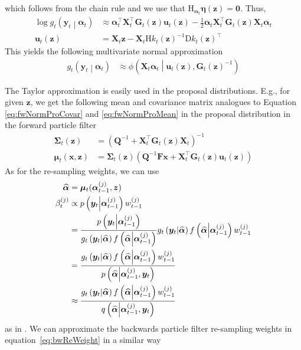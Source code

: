 \documentclass[notitlepage]{article}
\renewcommand{\vec}[1]{\bm{#1}}
\newcommand{\mat}[1]{\mathbf{#1}}
\newcommand{\Lparen}[1]{\left( #1\right)}
\newcommand{\Cond}[2]{ #1 \middle\vert  #2}
\newcommand{\optor}[2]{#1\Lparen{#2}}
\newcommand{\optorC}[3]{\optor{#1}{\Cond{#2}{#3}}}
\newcommand{\pdensC}[2]{\optorC{p}{#1}{#2}}
\newcommand{\normaldC}[3]{\optorC{\phi}{#1}{#2,#3}}
\newcommand{\IDC}[2]{\optorC{q}{#1}{#2}}
\newcommand{\partic}[3]{#1_{#2}^{\Lparen{#3}}}
\newcommand\Jaco{\mathrm D}
\newcommand\Hess{\mathrm H}
\begin{document}
%
which follows from the chain rule and we use that %
$\Hess_{\vec\alpha_t}\vec\eta(\vec z) = \mat 0$. Thus, %
%
\begin{align*}
\log\optorC{g_t}{\vec{y}_t}{\vec\alpha_t} &\approx 
	\vec\alpha_t^\top\mat X_t^\top\mat G_t(\vec z)\vec u_t(\vec z)
	- \frac 12 \vec\alpha_t\mat X_t^\top
	\mat G_t(\vec z)\mat X_t\vec\alpha_t \\
\vec u_t(\vec z) &= 
	\mat X_t\vec z - \mat X_t\Hess k_t(\vec z)^{-1}\Jaco k_t(\vec z)^\top
\end{align*}
%
This yields the following multivariate normal approximation %
%
\begin{align*}
\optorC{g_t}{\vec{y}_t}{\vec\alpha_t} &\approx 
	\normaldC{\mat X_t\vec\alpha_t}{\vec u_t(\vec z)}{\mat G_t(\vec z)^{-1}}
\end{align*}

The Taylor approximation is easily used in the proposal distributions. E.g., for given $\vec z$, we get the following mean and covariance matrix analogues to Equation \eqref{eq:fwNormProCovar} and \eqref{eq:fwNormProMean} in the proposal distribution in the forward particle filter %
%
\begin{align*}
\mat\Sigma_t(\vec z) &= \Lparen{\mat Q^{-1} + \mat X_t^\top
	\mat G_t(\vec z)\mat X_t}^{-1} \\
\vec\mu_t(\vec x, \vec z) &= \mat\Sigma_t(\vec z)\Lparen{
	\mat Q^{-1}\mat F\vec x + \mat X^\top_t\mat G_t(\vec z)
	\vec u_t(\vec z)}
\end{align*}%
% 
As for the re-sampling weights, we can use%
%
\begin{align*}
\widehat{\vec\alpha} &= \vec\mu_t(\partic{\vec\alpha}{t-1}j, \vec z) \\
\partic\beta tj &\propto 
	\pdensC{\vec y_t}{\partic{\vec\alpha}{t-1}j}\partic w{t-1}j \\
	&= \frac{ %
		\pdensC{\vec y_t}{\partic{\vec\alpha}{t-1}j}
	}{%
		\optorC{g_t}{\vec{y}_t}{\widehat{\vec\alpha}}
		\optorC{f}{\widehat{\vec\alpha}}{\partic{\vec\alpha}{t-1}j}
	}
	\optorC{g_t}{\vec{y}_t}{\widehat{\vec\alpha}}
	\optorC{f}{\widehat{\vec\alpha}}{\partic{\vec\alpha}{t-1}j}
	\partic w{t-1}j \\
	&= \frac{ %
		\optorC{g_t}{\vec{y}_t}{\widehat{\vec\alpha}}
		\optorC{f}{\widehat{\vec\alpha}}{\partic{\vec\alpha}{t-1}j}
		\partic w{t-1}j
	}{%
		\pdensC{\widehat{\vec\alpha}}{
		\partic{\vec\alpha}{t-1}j, \vec y_t}
	} \\
	&\approx
	\frac{ %
		\optorC{g_t}{\vec{y}_t}{\widehat{\vec\alpha}}
		\optorC{f}{\widehat{\vec\alpha}}{\partic{\vec\alpha}{t-1}j}
		\partic w{t-1}j
	}{%
		\IDC{\widehat{\vec\alpha}}{\partic{\vec\alpha}{t-1}j, \vec y_t}
	}
\end{align*}
%
as in \cite{fearnhead10}. We can approximate the backwards particle filter re-sampling weights in equation~\eqref{eq:bwReWeight} in a similar way
\end{document}
